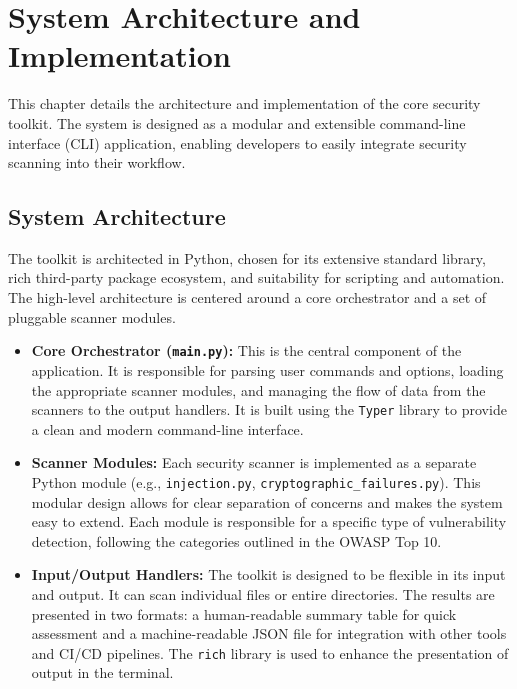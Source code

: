 \chapter{System Architecture and Implementation}
\label{chap:architecture}

\setlength{\parskip}{1em}

This chapter details the architecture and implementation of the core security toolkit. The system is designed as a modular and extensible command-line interface (CLI) application, enabling developers to easily integrate security scanning into their workflow.

\section{System Architecture}

The toolkit is architected in Python, chosen for its extensive standard library, rich third-party package ecosystem, and suitability for scripting and automation. The high-level architecture is centered around a core orchestrator and a set of pluggable scanner modules.

\begin{itemize}
    \item \textbf{Core Orchestrator (\texttt{main.py}):} This is the central component of the application. It is responsible for parsing user commands and options, loading the appropriate scanner modules, and managing the flow of data from the scanners to the output handlers. It is built using the \texttt{Typer} library to provide a clean and modern command-line interface.
    \item \textbf{Scanner Modules:} Each security scanner is implemented as a separate Python module (e.g., \texttt{injection.py}, \texttt{cryptographic\_failures.py}). This modular design allows for clear separation of concerns and makes the system easy to extend. Each module is responsible for a specific type of vulnerability detection, following the categories outlined in the OWASP Top 10.
    \item \textbf{Input/Output Handlers:} The toolkit is designed to be flexible in its input and output. It can scan individual files or entire directories. The results are presented in two formats: a human-readable summary table for quick assessment and a machine-readable JSON file for integration with other tools and CI/CD pipelines. The \texttt{rich} library is used to enhance the presentation of output in the terminal.
\end{itemize}

